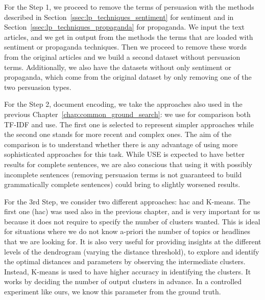For the Step 1, we proceed to remove the terms of persuasion with the methods described in Section~\ref{ssec:lp_techniques_sentiment} for sentiment and in Section~\ref{ssec:lp_techniques_propaganda} for propaganda. We input the text articles, and we get in output from the methods the terms that are loaded with sentiment or propaganda techniques. Then we proceed to remove these words from the original articles and we build a second dataset without persuasion terms.
Additionally, we also have the datasets without only sentiment or propaganda, which come from the original dataset by only removing one of the two persuasion types.

For the Step 2, document encoding, we take the approaches 
also used in the previous Chapter~\ref{chap:common_ground_search}: we use for comparison both TF-IDF and \acrshort{use}. The first one is selected to represent simpler approaches while the second one stands for more recent and complex ones. The aim of the comparison is to understand whether there is any advantage of using more sophisticated approaches for this task.
While USE is expected to have better results for complete sentences, we are also conscious that using it with possibly incomplete sentences (removing persuasion terms is not guaranteed to build grammatically complete sentences) could bring to slightly worsened results.

For the 3rd Step, we consider two different approaches: \acrlong{hac} and K-means. The first one (\acrshort{hac}) was used also in the previous chapter, and is very important for us because it does not require to specify the number of clusters wanted. This is ideal for situations where we do not know a-priori the number of topics or headlines that we are looking for. It is also very useful for providing insights at the different levels of the dendrogram (varying the distance threshold), to explore and identify the optimal distances and parameters by observing the intermediate clusters.
Instead, K-means is used to have higher accuracy in identifying the clusters. It works by deciding the number of output clusters in advance.
In a controlled experiment like ours, we know this parameter from the ground truth. %

